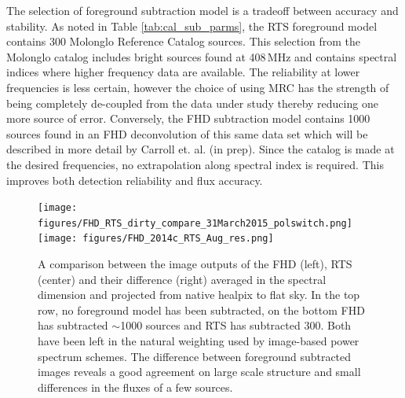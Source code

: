 \documentclass[preprint2]{aastex}
\begin{document}
The selection of foreground subtraction model is a tradeoff between accuracy and stability.
As noted in Table \ref{tab:cal_sub_parms}, the RTS foreground model contains 300 Molonglo Reference Catalog sources. This selection from the Molonglo catalog includes bright sources found at 408\,MHz and contains spectral indices where higher frequency data are available. The reliability at lower frequencies is less certain, however the choice of using MRC has the strength of being completely de-coupled from the data under study thereby reducing one more source of error. Conversely, the FHD subtraction model contains 1000 sources found in an FHD deconvolution of this same data set which will be described in more detail by Carroll et. al. (in prep).  Since the catalog is made at the desired frequencies, no extrapolation along spectral index is required. This improves both detection reliability and flux accuracy.


\begin{figure}[htb]
\begin{center}
\texttt{[image: figures/FHD\_RTS\_dirty\_compare\_31March2015\_polswitch.png]}
\texttt{[image: figures/FHD\_2014c\_RTS\_Aug\_res.png]}
\caption{A comparison between the image outputs of the FHD (left), RTS (center) and their difference (right) averaged in the spectral dimension and projected from native healpix to flat sky.  In the top row, no foreground model has been subtracted, on the bottom FHD has subtracted $\sim$1000 sources and RTS has subtracted 300.  Both have been left in the natural weighting used by image-based power spectrum schemes. The difference between foreground subtracted images reveals a good agreement on large scale structure and small differences in the fluxes of a few sources.
\label{fig:image_compare}}
\end{center}
\end{figure}

%
%



\end{document}

